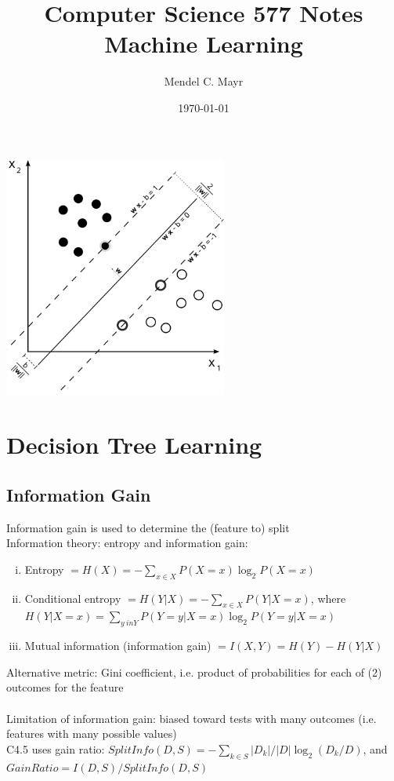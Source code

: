 \documentclass{article}
\title{Computer Science 577 Notes \\ Machine Learning}
\author{Mendel C. Mayr}
\date{\today}
\begin{document}
	\maketitle
	\vspace{10pt}
	\begin{center}
		\includegraphics[width = 2.9in]{svm.png}
		\end{center}
	\vspace{16pt}
	\tableofcontents
	\clearpage

	\section{Decision Tree Learning}
		\subsection{Information Gain}
			Information gain is used to determine the (feature to) split \\
			Information theory: entropy and information gain:
			\begin{enumerate}[(i)]
				\item Entropy $= H(X) = -\sum_{x \in X}P(X = x)\log_2 P(X = x)$
				\item Conditional entropy $= H(Y|X) = -\sum_{x \in X}P(Y|X = x)$, where \\
				$H(Y|X = x) = \sum_{y \ in Y}P(Y = y|X = x)\log_2 P(Y = y|X = x)$
				\item Mutual information (information gain) $= I(X, Y) = H(Y) - H(Y|X)$
				\end{enumerate}
			Alternative metric: Gini coefficient, i.e. product of probabilities for each of (2) outcomes for the feature \\
			\\
			Limitation of information gain: biased toward tests with many outcomes (i.e. features with many possible values) \\
			C4.5 uses gain ratio: $SplitInfo(D, S) = -\sum_{k \in S} |D_k|/|D| \log_2(D_k/D)$, and $GainRatio = I(D, S)/SplitInfo(D, S)$
\end{document}
